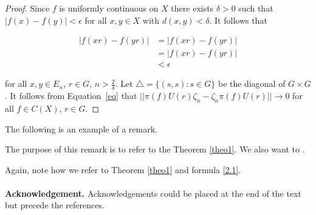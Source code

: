 \documentclass[12pt, reqno]{amsart}
\numberwithin{equation}{section}
\begin{document}

\begin{proof}
Since $f$ is uniformly continuous on $X$ there exists $\delta>0$ such that $|f(x)-f(y)|<\epsilon$ for all $x,y\in X$ with $d(x,y)<\delta$. It follows that

\begin{align}\label{eq}
|f(xr)-f(yr)|&=|f(xr)-f(yr)|\nonumber\\
&=|f(xr)-f(yr)|\nonumber\\
&< \epsilon
\end{align}



for all $x,y\in E_n$, $r\in G$, $n>\frac{2}{\delta}$. Let $\bigtriangleup = \{(s, s): s\in G\}$ be the diagonal of $G\times G$. It follows from Equation~\eqref{eq} that  $||\pi(f)U(r)\zeta_n-\zeta_n\pi(f)U(r)||\rightarrow 0$ for all $f\in C(X)$, $r\in G$.
\end{proof}


The following is an example of a remark.


\begin{remark}
The purpose of this remark is to refer to the Theorem
\ref{theo1}. We also want to \cite{Brown, Connes}.
\end{remark}


Again, note how we refer to Theorem \ref{theo1} and formula \eqref{2.1}.
\\
\\
{\bf Acknowledgement.} Acknowledgements could be placed at the end
of the text but precede the references.
\end{document}
